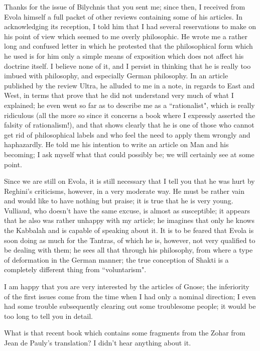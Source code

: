 Thanks for the issue of Bilychnis that you sent me; since then, I received from Evola himself a full packet of other reviews containing some of his articles. In acknowledging its reception, I told him that I had several reservations to make on his point of view which seemed to me overly philosophic. He wrote me a rather long and confused letter in which he protested that the philosophical form which he used is for him only a simple means of exposition which does not affect his doctrine itself. I believe none of it, and I persist in thinking that he is really too imbued with philosophy, and especially German philosophy. In an article published by the review Ultra, he alluded to me in a note, in regards to East and West, in terms that prove that he did not understand very much of what I explained; he even went so far as to describe me as a ``rationalist", which is really ridiculous (all the more so since it concerns a book where I expressly asserted the falsity of rationalism!), and that shows clearly that he is one of those who cannot get rid of philosophical labels and who feel the need to apply them wrongly and haphazardly. He told me his intention to write an article on Man and his becoming; I ask myself what that could possibly be; we will certainly see at some point.

Since we are still on Evola, it is still necessary that I tell you that he was hurt by Reghini's criticisms, however, in a very moderate way. He must be rather vain and would like to have nothing but praise; it is true that he is very young. Vulliaud, who doesn't have the same excuse, is almost as susceptible; it appears that he also was rather unhappy with my article; he imagines that only he knows the Kabbalah and is capable of speaking about it. It is to be feared that Evola is soon doing as much for the Tantras, of which he is, however, not very qualified to be dealing with them; he sees all that through his philosophy, from where a type of deformation in the German manner; the true conception of Shakti is a completely different thing from ``voluntarism".

I am happy that you are very interested by the articles of Gnose; the inferiority of the first issues come from the time when I had only a nominal direction; I even had some trouble subsequently clearing out some troublesome people; it would be too long to tell you in detail.

What is that recent book which contains some fragments from the Zohar from Jean de Pauly's translation? I didn't hear anything about it.

